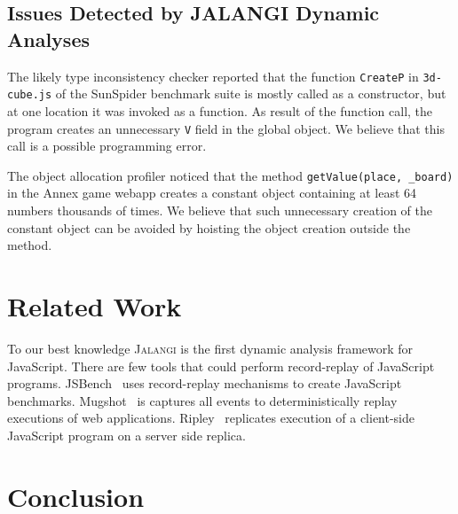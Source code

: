 \documentclass{sig-alternate}
\def\jalangi{\textsc{Jalangi}}
\begin{document}
\subsection{Issues Detected by JALANGI Dynamic Analyses}
\label{sec:issu-detect-dynam}


The likely type inconsistency checker reported that the function
\texttt{CreateP}  in \texttt{3d-cube.js} of the SunSpider
benchmark suite is mostly called as a constructor, but at one location
it was invoked as a function.  As result of the function call, the
program creates an unnecessary \texttt{V} field in the global object.
We believe that this call is a possible programming error.

 
The object allocation profiler noticed that the method
\texttt{getValue(place, \_board)} in the Annex game webapp creates a
constant object containing at least 64 numbers thousands of times.  We
believe that such unnecessary creation of the constant object can be
avoided by hoisting the object creation outside the method.


\section{Related Work}
\label{sec:related-work}

To our best knowledge \jalangi{} is the first dynamic analysis
framework for JavaScript.  There are few tools that could perform
record-replay of JavaScript programs.
JSBench~\cite{Richards:2011:ACJ:2048066.2048119} uses record-replay
mechanisms to create JavaScript benchmarks.
Mugshot~\cite{Mickens:2010:MDC:1855711.1855722} is captures all events
to deterministically replay executions of web applications.
Ripley~\cite{Vikram:2009:RAS:1653662.1653685} replicates execution of
a client-side JavaScript program on a server side replica.


\section{Conclusion}
\label{sec:conclusion}
\end{document}
